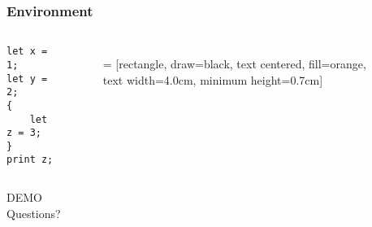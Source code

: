 \documentclass{beamer}
\begin{document}
    \begin{frame}[fragile]
    \frametitle{Environment}
    \begin{columns}
    \begin{lstlisting}[]
let x = 1;
let y = 2;
{
    let z = 3;
}
print z;
    \end{lstlisting}
    \begin{figure}
     = [rectangle, draw=black, text centered, fill=orange, text width=4.0cm, minimum height=0.7cm]
    \end{figure}
    \end{columns}
    \end{frame}

    \begin{frame}
        \begin{center}
            \Huge DEMO \\
            \Huge Questions?
        \end{center}
    \end{frame}
    
\end{document}
